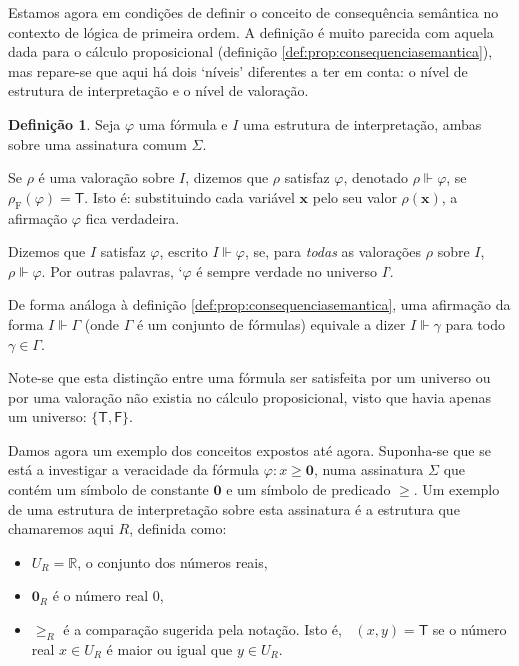 \documentclass{report}
\theoremstyle{definition}
\newtheorem{definicao}{Definição}
\theoremstyle{remark}
\newcommand{\R}{\mathbb{R}}
\renewcommand{\bf}[1]{\mathbf{#1}}
\newcommand{\F}{\mathrm{F}}
\newcommand{\lt}{\mathsf{T}}
\newcommand{\lf}{\mathsf{F}}
\begin{document}
	Estamos agora em condições de definir o conceito de consequência semântica no contexto de lógica de primeira ordem. A definição é muito parecida com aquela dada para o cálculo proposicional (definição \ref{def:prop:consequenciasemantica}), mas repare-se que aqui há dois `níveis' diferentes a ter em conta: o nível de estrutura de interpretação e o nível de valoração.
	
	\begin{definicao}
	Seja $\varphi$ uma fórmula e $I$ uma estrutura de interpretação, ambas sobre uma assinatura comum $\Sigma$.
	
	Se $\rho$ é uma valoração sobre $I$, dizemos que $\rho$ satisfaz $\varphi$, denotado $\rho \Vdash \varphi$, se $\rho_\F(\varphi) = \lt$. Isto é: substituindo cada variável $\bf x$ pelo seu valor $\rho(\bf x)$, a afirmação $\varphi$ fica verdadeira.
	
	Dizemos que $I$ satisfaz $\varphi$, escrito $I \Vdash \varphi$, se, para \emph{todas} as valorações $\rho$ sobre $I$, $\rho \Vdash \varphi$. Por outras palavras, `$\varphi$ é sempre verdade no universo $I$'.
	
	De forma análoga à definição \ref{def:prop:consequenciasemantica}, uma afirmação da forma $I \Vdash \Gamma$ (onde $\Gamma$ é um conjunto de fórmulas) equivale a dizer $I \Vdash \gamma$ para todo $\gamma \in \Gamma$.
	\end{definicao}
	
	Note-se que esta distinção entre uma fórmula ser satisfeita por um universo ou por uma valoração não existia no cálculo proposicional, visto que havia apenas um universo: $\{\lt, \lf\}$.

	Damos agora um exemplo dos conceitos expostos até agora. Suponha-se que se está a investigar a veracidade da fórmula $\varphi : x \geq \bf 0$, numa assinatura $\Sigma$ que contém um símbolo de constante $\bf 0$ e um símbolo de predicado $\geq$. Um exemplo de uma estrutura de interpretação sobre esta assinatura é a estrutura que chamaremos aqui $R$, definida como:
	\begin{itemize}
	\item $U_R = \R$, o conjunto dos números reais,

	\item $\bf 0_R$ é o número real 0,

	\item $\geq_R$ é a comparação sugerida pela notação. Isto é, $\mathop{\geq_R}(x, y) = \lt$ se o número real $x \in U_R$ é maior ou igual que $y \in U_R$.
	\end{itemize}
\end{document}
